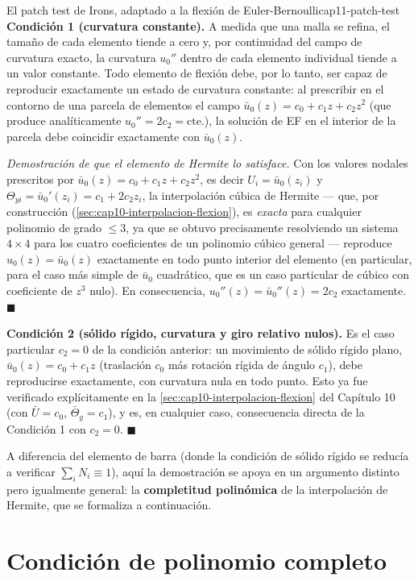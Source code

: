 \begin{teorema}{El patch test de Irons, adaptado a la flexión de Euler-Bernoulli}{cap11-patch-test}
\textbf{Condición 1 (curvatura constante).} A medida que una malla se refina, el tamaño de cada elemento tiende a cero y, por continuidad del campo de curvatura exacto, la curvatura $u_0''$ dentro de cada elemento individual tiende a un valor constante. Todo elemento de flexión debe, por lo tanto, ser capaz de reproducir exactamente un estado de curvatura constante: al prescribir en el contorno de una parcela de elementos el campo $\bar u_0(z)=c_0+c_1z+c_2z^2$ (que produce analíticamente $u_0''=2c_2=\text{cte.}$), la solución de EF en el interior de la parcela debe coincidir exactamente con $\bar u_0(z)$.

\emph{Demostración de que el elemento de Hermite lo satisface.} Con los valores nodales prescritos por $\bar u_0(z)=c_0+c_1z+c_2z^2$, es decir $U_i=\bar u_0(z_i)$ y $\Theta_{yi}=\bar u_0'(z_i)=c_1+2c_2z_i$, la interpolación cúbica de Hermite --- que, por construcción (\cref{sec:cap10-interpolacion-flexion}), es \emph{exacta} para cualquier polinomio de grado $\leq3$, ya que se obtuvo precisamente resolviendo un sistema $4\times4$ para los cuatro coeficientes de un polinomio cúbico general --- reproduce $u_0(z)=\bar u_0(z)$ exactamente en todo punto interior del elemento (en particular, para el caso más simple de $\bar u_0$ cuadrático, que es un caso particular de cúbico con coeficiente de $z^3$ nulo). En consecuencia, $u_0''(z)=\bar u_0''(z)=2c_2$ exactamente. $\blacksquare$

\textbf{Condición 2 (sólido rígido, curvatura y giro relativo nulos).} Es el caso particular $c_2=0$ de la condición anterior: un movimiento de sólido rígido plano, $\bar u_0(z)=c_0+c_1z$ (traslación $c_0$ más rotación rígida de ángulo $c_1$), debe reproducirse exactamente, con curvatura nula en todo punto. Esto ya fue verificado explícitamente en la \cref{sec:cap10-interpolacion-flexion} del Capítulo 10 (con $\bar U=c_0$, $\bar\Theta_y=c_1$), y es, en cualquier caso, consecuencia directa de la Condición 1 con $c_2=0$. $\blacksquare$
\end{teorema}

A diferencia del elemento de barra (donde la condición de sólido rígido se reducía a verificar $\sum_i N_i\equiv1$), aquí la demostración se apoya en un argumento distinto pero igualmente general: la \textbf{completitud polinómica} de la interpolación de Hermite, que se formaliza a continuación.

\section{Condición de polinomio completo}
\label{sec:cap11-polinomio-completo}

